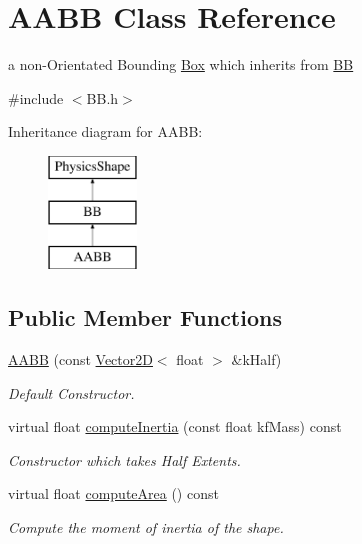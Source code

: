 \hypertarget{class_a_a_b_b}{\section{A\+A\+B\+B Class Reference}
\label{class_a_a_b_b}
}


a non-\/\+Orientated Bounding \hyperlink{class_box}{Box} which inherits from \hyperlink{class_b_b}{B\+B}  




{\ttfamily \#include $<$B\+B.\+h$>$}

Inheritance diagram for A\+A\+B\+B\+:\begin{figure}[H]
\begin{center}
\leavevmode
\includegraphics[height=3.000000cm]{class_a_a_b_b}
\end{center}
\end{figure}
\subsection*{Public Member Functions}
\begin{DoxyCompactItemize}
\item 
\hypertarget{class_a_a_b_b_a02dd4417acfbf243c183b98087305ef5}{\hyperlink{class_a_a_b_b_a02dd4417acfbf243c183b98087305ef5}{A\+A\+B\+B} (const \hyperlink{class_vector2_d}{Vector2\+D}$<$ float $>$ \&k\+Half)}\label{class_a_a_b_b_a02dd4417acfbf243c183b98087305ef5}

\begin{DoxyCompactList}\small\item\em Default Constructor. \end{DoxyCompactList}\item 
\hypertarget{class_a_a_b_b_aa3273dd7c64243f28cd2d11f7c4f5b8c}{virtual float \hyperlink{class_a_a_b_b_aa3273dd7c64243f28cd2d11f7c4f5b8c}{compute\+Inertia} (const float kf\+Mass) const }\label{class_a_a_b_b_aa3273dd7c64243f28cd2d11f7c4f5b8c}

\begin{DoxyCompactList}\small\item\em Constructor which takes Half Extents. \end{DoxyCompactList}\item 
\hypertarget{class_a_a_b_b_a14f5bf01839aacdc7f3317b326c83957}{virtual float \hyperlink{class_a_a_b_b_a14f5bf01839aacdc7f3317b326c83957}{compute\+Area} () const }\label{class_a_a_b_b_a14f5bf01839aacdc7f3317b326c83957}

\begin{DoxyCompactList}\small\item\em Compute the moment of inertia of the shape. \end{DoxyCompactList}\end{DoxyCompactItemize}
